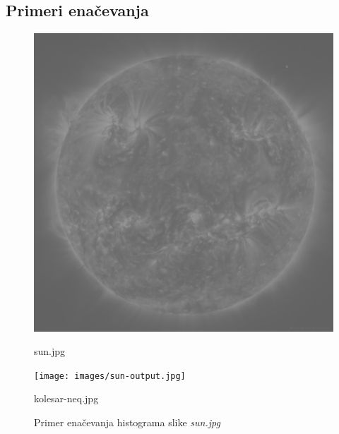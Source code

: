 \documentclass{article}
\begin{document}
\subsection{Primeri enačevanja}
\begin{figure}[!h]
    \begin{minipage}{0.48\textwidth}
        \centering
        \includegraphics[width=.9\linewidth]{images/sun.jpg}
        \caption{sun.jpg}
    \end{minipage}\hfill
    \begin{minipage}{0.48\textwidth}
        \centering
        \texttt{[image: images/sun-output.jpg]}
        \caption{kolesar-neq.jpg}
    \end{minipage}
    \caption{Primer enačevanja histograma slike \textit{sun.jpg}}
\end{figure}
\end{document}
